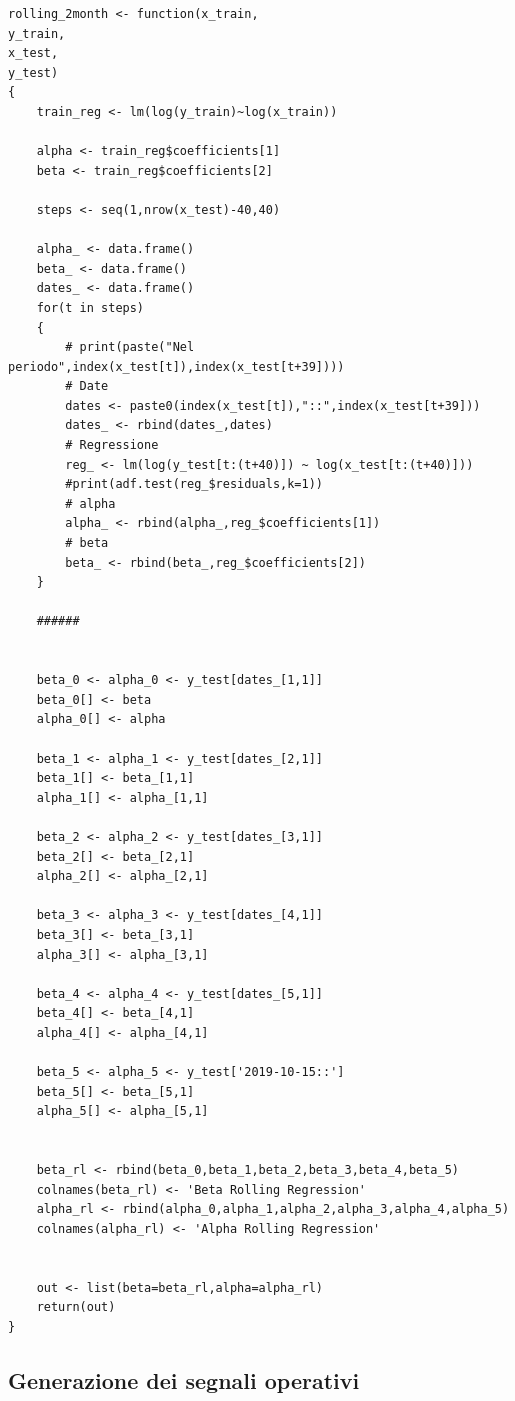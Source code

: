 \documentclass[]{article}
\begin{document}
\begin{lstlisting}
rolling_2month <- function(x_train,
y_train,
x_test,
y_test)
{
	train_reg <- lm(log(y_train)~log(x_train))
	
	alpha <- train_reg$coefficients[1]
	beta <- train_reg$coefficients[2]
	
	steps <- seq(1,nrow(x_test)-40,40)
	
	alpha_ <- data.frame()
	beta_ <- data.frame()
	dates_ <- data.frame()
	for(t in steps)
	{
		# print(paste("Nel periodo",index(x_test[t]),index(x_test[t+39])))
		# Date
		dates <- paste0(index(x_test[t]),"::",index(x_test[t+39]))
		dates_ <- rbind(dates_,dates)
		# Regressione
		reg_ <- lm(log(y_test[t:(t+40)]) ~ log(x_test[t:(t+40)]))
		#print(adf.test(reg_$residuals,k=1))
		# alpha
		alpha_ <- rbind(alpha_,reg_$coefficients[1])
		# beta
		beta_ <- rbind(beta_,reg_$coefficients[2])
	}
	
	######
	
	
	beta_0 <- alpha_0 <- y_test[dates_[1,1]]
	beta_0[] <- beta
	alpha_0[] <- alpha
	
	beta_1 <- alpha_1 <- y_test[dates_[2,1]]
	beta_1[] <- beta_[1,1]
	alpha_1[] <- alpha_[1,1]
	
	beta_2 <- alpha_2 <- y_test[dates_[3,1]]
	beta_2[] <- beta_[2,1]
	alpha_2[] <- alpha_[2,1]
	
	beta_3 <- alpha_3 <- y_test[dates_[4,1]]
	beta_3[] <- beta_[3,1]
	alpha_3[] <- alpha_[3,1]
	
	beta_4 <- alpha_4 <- y_test[dates_[5,1]]
	beta_4[] <- beta_[4,1]
	alpha_4[] <- alpha_[4,1]
	
	beta_5 <- alpha_5 <- y_test['2019-10-15::']
	beta_5[] <- beta_[5,1]
	alpha_5[] <- alpha_[5,1]
	
	
	beta_rl <- rbind(beta_0,beta_1,beta_2,beta_3,beta_4,beta_5)
	colnames(beta_rl) <- 'Beta Rolling Regression'
	alpha_rl <- rbind(alpha_0,alpha_1,alpha_2,alpha_3,alpha_4,alpha_5)
	colnames(alpha_rl) <- 'Alpha Rolling Regression'
	
	
	out <- list(beta=beta_rl,alpha=alpha_rl)
	return(out)
}

\end{lstlisting}

\subsection*{Generazione dei segnali operativi}
\end{document}
